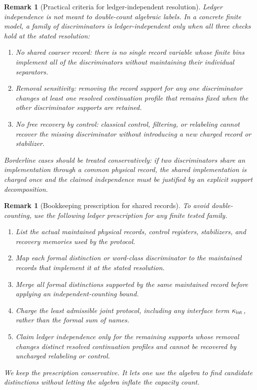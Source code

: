 \documentclass[11pt]{article}
\newtheorem{remark}[theorem]{Remark}
\begin{document}
\begin{remark}[Practical criteria for ledger-independent resolution]\label{rem:ledger-independence-practice}
Ledger independence is not meant to double-count algebraic labels.  In a concrete finite model, a family of discriminators is ledger-independent only when all three checks hold at the stated resolution:
\begin{enumerate}[label=(\roman*),leftmargin=2em]
\item \emph{No shared coarser record:} there is no single record variable whose finite bins implement all of the discriminators without maintaining their individual separators.
\item \emph{Removal sensitivity:} removing the record support for any one discriminator changes at least one resolved continuation profile that remains fixed when the other discriminator supports are retained.
\item \emph{No free recovery by control:} classical control, filtering, or relabeling cannot recover the missing discriminator without introducing a new charged record or stabilizer.
\end{enumerate}
Borderline cases should be treated conservatively: if two discriminators share an implementation through a common physical record, the shared implementation is charged once and the claimed independence must be justified by an explicit support decomposition.
\end{remark}


\begin{remark}[Bookkeeping prescription for shared records]\label{rem:shared-record-bookkeeping}
To avoid double-counting, use the following ledger prescription for any finite tested family.
\begin{enumerate}[label=(\roman*),leftmargin=2em]
\item List the actual maintained physical records, control registers, stabilizers, and recovery memories used by the protocol.
\item Map each formal distinction or word-class discriminator to the maintained records that implement it at the stated resolution.
\item Merge all formal distinctions supported by the same maintained record before applying an independent-counting bound.
\item Charge the least admissible joint protocol, including any interface term \(\kappa_{\rm int}\), rather than the formal sum of names.
\item Claim ledger independence only for the remaining supports whose removal changes distinct resolved continuation profiles and cannot be recovered by uncharged relabeling or control.
\end{enumerate}
We keep the prescription conservative.  It lets one use the algebra to find candidate distinctions without letting the algebra inflate the capacity count.
\end{remark}
\end{document}
